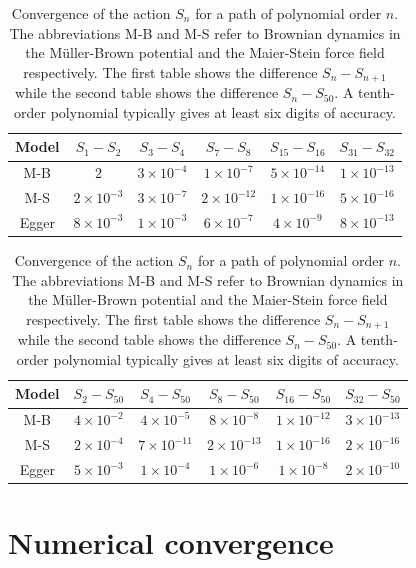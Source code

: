 \begin{table}
\begin{centering}

\begin{tabular}{|c|c|c|c|c|c|}
\hline 
Model & $S_{1}-S_{2}$ & $S_{3}-S_{4}$ & $S_{7}-S_{8}$ & $S_{15}-S_{16}$ & $S_{31}-S_{32}$\tabularnewline
\hline 
\hline 
M-B & $2$ & $3\times10^{-4}$ & $1\times10^{-7}$ & $5\times10^{-14}$ & $1\times10^{-13}$\tabularnewline
\hline 
M-S & $2\times10^{-3}$ & $3\times10^{-7}$ & $2\times10^{-12}$ & $1\times10^{-16}$ & $5\times10^{-16}$\tabularnewline
\hline 
Egger & $8\times10^{-3}$ & $1\times10^{-3}$ & $6\times10^{-7}$ & $4\times10^{-9}$ & $8\times10^{-13}$\tabularnewline
\hline 
\end{tabular}%

\vspace{0.2cm}

\begin{tabular}{|c|c|c|c|c|c|}
\hline 
Model & $S_{2}-S_{50}$ & $S_{4}-S_{50}$ & $S_{8}-S_{50}$ & $S_{16}-S_{50}$ & $S_{32}-S_{50}$\tabularnewline
\hline 
\hline 
M-B & $4\times10^{-2}$ & $4\times10^{-5}$ & $8\times10^{-8}$ & $1\times10^{-12}$ & $3\times10^{-13}$\tabularnewline
\hline 
M-S & $2\times10^{-4}$ & $7\times10^{-11}$ & $2\times10^{-13}$ & $1\times10^{-16}$ & $2\times10^{-16}$\tabularnewline
\hline 
Egger & $5\times10^{-3}$ & $1\times10^{-4}$ & $1\times10^{-6}$ & $1\times10^{-8}$ & $2\times10^{-10}$\tabularnewline
\hline 
\end{tabular}

\par\end{centering}
\caption{Convergence of the action $S_{n}$ for a path of polynomial order
$n$. The abbreviations M-B and M-S refer to Brownian dynamics in
the Müller-Brown potential and the Maier-Stein force field respectively.
The first table shows the difference $S_{n}-S_{n+1}$ while
the second table shows the difference $S_{n}-S_{50}$. A tenth-order polynomial
typically gives at least six digits of accuracy. {\label{tab:Convergence}}}
\end{table}

\section{Numerical convergence}

